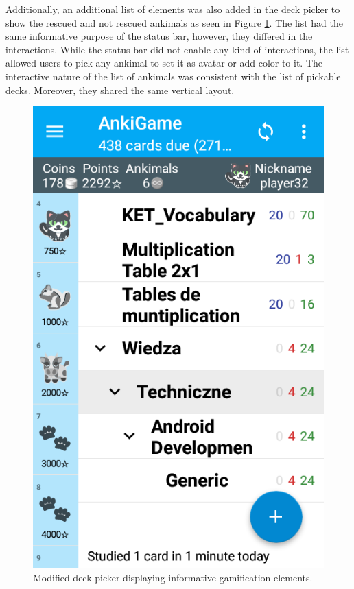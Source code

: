 Additionally, an additional list of elements was also added in the deck picker to show the rescued and not rescued ankimals as seen in Figure \ref{fig:progress}. The list had the same informative purpose of the status bar, however, they differed in the interactions. While the status bar did not enable any kind of interactions, the list allowed users to pick any ankimal to set it as avatar or add color to it. The interactive nature of the list of ankimals was consistent with the list of pickable decks. Moreover, they shared the same vertical layout.

\begin{figure}[htb]
    \vskip 5mm
        \begin{center}
            \includegraphics[scale=0.4]{./Figures/progress.png}
            \caption{Modified deck picker displaying informative gamification elements.}
            \label{fig:progress}
        \end{center}
    \vskip -5mm
\end{figure}

